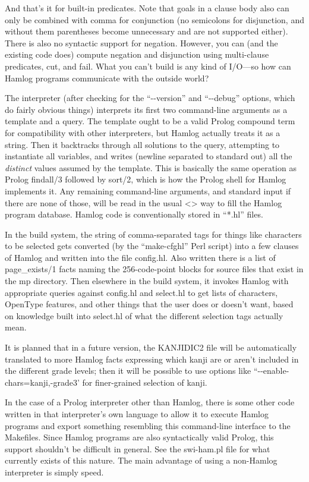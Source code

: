 \documentclass[14pt]{extarticle}
\begin{document}
And that's it for built-in predicates.  Note that goals in a clause body
also can only be combined with comma for conjunction (no semicolons for
disjunction, and without them parentheses become unnecessary and are not
supported either).  There is also no syntactic support for negation. 
However, you can (and the existing code does) compute negation and
disjunction using multi-clause predicates, cut, and fail.  What you can't
build is any kind of I/O---so how can Hamlog programs communicate with the
outside world?

The interpreter (after checking for the ``-{}-version'' and ``-{}-debug''
options, which do fairly obvious things) interprets its first two
command-line arguments as a template and a query.  The template ought to be
a valid Prolog compound term for compatibility with other interpreters, but
Hamlog actually treats it as a string.  Then it backtracks through all
solutions to the query, attempting to instantiate all variables, and writes
(newline separated to standard out) all the \emph{distinct} values
assumed by the template.  This is basically the same operation as Prolog
findall/3 followed by sort/2, which is how the Prolog shell for Hamlog
implements it.  Any remaining command-line arguments, and standard input if
there are none of those, will be read in the usual <> way to fill the
Hamlog program database.  Hamlog code is conventionally stored in ``*.hl''
files.

In the build system, the string of comma-separated tags for things like
characters to be selected gets converted (by the ``make-cfghl'' Perl script)
into a few clauses of Hamlog and written into the file config.hl.  Also
written there is a list of page\_exists/1 facts naming the 256-code-point
blocks for source files that exist in the mp directory.  Then elsewhere in
the build system, it invokes Hamlog with appropriate queries against
config.hl and select.hl to get lists of characters, OpenType features, and
other things that the user does or doesn't want, based on knowledge built
into select.hl of what the different selection tags actually mean.

It is planned that in a future version, the KANJIDIC2 file will be
automatically translated to more Hamlog facts expressing which kanji are or
aren't included in the different grade levels; then it will be possible to
use options like ``-{}-enable-chars=kanji,-grade3' for finer-grained selection
of kanji.

In the case of a Prolog interpreter other than Hamlog, there is some
other code written in that interpreter's own language to allow it to execute
Hamlog programs and export something resembling this command-line interface
to the Makefiles.  Since Hamlog programs are also syntactically valid
Prolog, this support shouldn't be difficult in general.  See the swi-ham.pl
file for what currently exists of this nature.  The main advantage of using
a non-Hamlog interpreter is simply speed.
\end{document}
